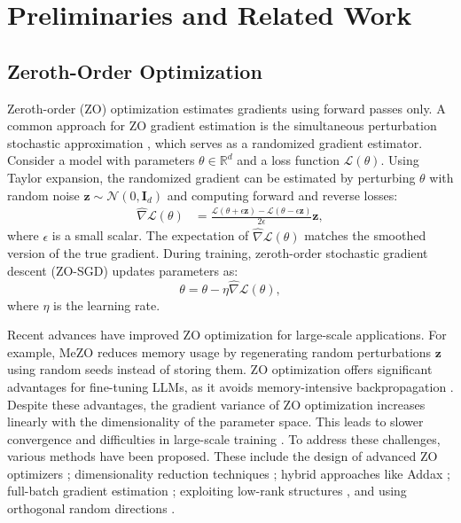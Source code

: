 
\section{Preliminaries and Related Work}
\label{sec:prelim_related}

\subsection{Zeroth-Order Optimization}

Zeroth-order (ZO) optimization estimates gradients using forward passes only. A common approach for ZO gradient estimation is the simultaneous perturbation stochastic approximation \citep{spall1992multivariate}, which serves as a randomized gradient estimator. Consider a model with parameters $\theta \in \mathbb{R}^d$ and a loss function $\mathcal{L}(\theta)$. Using Taylor expansion, the randomized gradient can be estimated by perturbing $\theta$ with random noise $\mathbf{z} \sim \mathcal{N}(0, \bm{I}_d)$ and computing forward and reverse losses:
\vspace{-5pt} 
\begin{align}
\widehat{\nabla} \mathcal{L}(\theta)
&= \frac{\mathcal{L}(\theta + \epsilon \mathbf{z}) - \mathcal{L}(\theta - \epsilon \mathbf{z})}{2 \epsilon} \mathbf{z},
\end{align}
\vspace{-2pt} 
\noindent where $\epsilon$ is a small scalar. The expectation of $\widehat{\nabla} \mathcal{L}(\theta)$ matches the smoothed version of the true gradient. During training, zeroth-order stochastic gradient descent (ZO-SGD) updates parameters as:
\vspace{-9pt} 
\begin{equation}
\theta = \theta - \eta \widehat{\nabla} \mathcal{L}(\theta),
\end{equation}
\vskip -9pt 
\noindent where $\eta$ is the learning rate. 

Recent advances have improved ZO optimization for large-scale applications. For example, MeZO \citep{malladi2023mezo} reduces memory usage by regenerating random perturbations $\mathbf{z}$ using random seeds instead of storing them. ZO optimization offers significant advantages for fine-tuning LLMs, as it avoids memory-intensive backpropagation \citep{liu2020primer,zhang2024revisiting}.
Despite these advantages, the gradient variance of ZO optimization increases linearly with the dimensionality of the parameter space. This leads to slower convergence and difficulties in large-scale training \citep{chen2024enhancing}. To address these challenges, various methods have been proposed. These include the design of advanced ZO optimizers \citep{zhao2024second,jiang2024zo,chen2019zo}; dimensionality reduction techniques \citep{liu2024sparse,wang2024simultaneous,yang2024adazeta,guo2024zeroth}; hybrid approaches like Addax \citep{li2024addax}; full-batch gradient estimation \citep{gautam2024variance}; exploiting low-rank structures \citep{zhao2023tensor,yu2024subzero}, and using orthogonal random directions \citep{kozak2023zeroth}.

